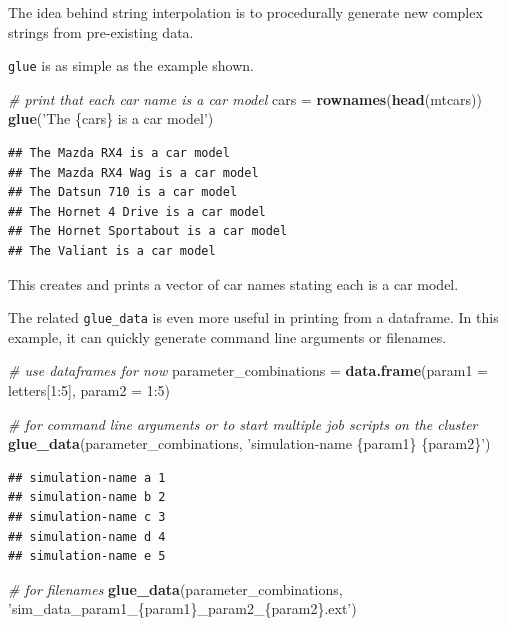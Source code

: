 \documentclass[]{book}
\newenvironment{Shaded}{}{}
\newcommand{\CommentTok}[1]{\textcolor[rgb]{0.38,0.63,0.69}{\textit{#1}}}
\newcommand{\DataTypeTok}[1]{\textcolor[rgb]{0.56,0.13,0.00}{#1}}
\newcommand{\DecValTok}[1]{\textcolor[rgb]{0.25,0.63,0.44}{#1}}
\newcommand{\KeywordTok}[1]{\textcolor[rgb]{0.00,0.44,0.13}{\textbf{#1}}}
\newcommand{\NormalTok}[1]{#1}
\newcommand{\OperatorTok}[1]{\textcolor[rgb]{0.40,0.40,0.40}{#1}}
\newcommand{\StringTok}[1]{\textcolor[rgb]{0.25,0.44,0.63}{#1}}
\begin{document}
The idea behind string interpolation is to procedurally generate new complex strings from pre-existing data.

\texttt{glue} is as simple as the example shown.

\begin{Shaded}
\begin{Highlighting}[]
\CommentTok{# print that each car name is a car model}
\NormalTok{cars =}\StringTok{ }\KeywordTok{rownames}\NormalTok{(}\KeywordTok{head}\NormalTok{(mtcars))}
\KeywordTok{glue}\NormalTok{(}\StringTok{'The \{cars\} is a car model'}\NormalTok{)}
\end{Highlighting}
\end{Shaded}

\begin{verbatim}
## The Mazda RX4 is a car model
## The Mazda RX4 Wag is a car model
## The Datsun 710 is a car model
## The Hornet 4 Drive is a car model
## The Hornet Sportabout is a car model
## The Valiant is a car model
\end{verbatim}

This creates and prints a vector of car names stating each is a car model.

The related \texttt{glue\_data} is even more useful in printing from a dataframe.
In this example, it can quickly generate command line arguments or filenames.

\begin{Shaded}
\begin{Highlighting}[]
\CommentTok{# use dataframes for now}
\NormalTok{parameter_combinations =}\StringTok{ }\KeywordTok{data.frame}\NormalTok{(}\DataTypeTok{param1 =}\NormalTok{ letters[}\DecValTok{1}\OperatorTok{:}\DecValTok{5}\NormalTok{],}
                                    \DataTypeTok{param2 =} \DecValTok{1}\OperatorTok{:}\DecValTok{5}\NormalTok{)}

\CommentTok{# for command line arguments or to start multiple job scripts on the cluster}
\KeywordTok{glue_data}\NormalTok{(parameter_combinations,}
          \StringTok{'simulation-name \{param1\} \{param2\}'}\NormalTok{)}
\end{Highlighting}
\end{Shaded}

\begin{verbatim}
## simulation-name a 1
## simulation-name b 2
## simulation-name c 3
## simulation-name d 4
## simulation-name e 5
\end{verbatim}

\begin{Shaded}
\begin{Highlighting}[]
\CommentTok{# for filenames}
\KeywordTok{glue_data}\NormalTok{(parameter_combinations,}
          \StringTok{'sim_data_param1_\{param1\}_param2_\{param2\}.ext'}\NormalTok{)}
\end{Highlighting}
\end{Shaded}
\end{document}
